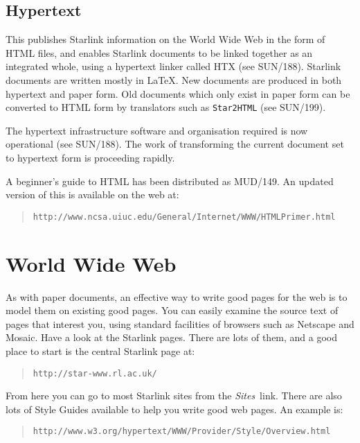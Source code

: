 \documentclass[twoside,11pt]{article}
\newcommand{\htmladdnormallink}[2]{#1}
\newcommand{\xref}[3]{#1}
\begin{document}
\subsection{Hypertext}

This publishes Starlink information on the World Wide Web in the
form of HTML files, and enables Starlink documents to be linked together
as an integrated whole, using a hypertext linker called HTX
(see \xref{SUN/188}{sun188}{}).
Starlink documents are written mostly in \LaTeX.
New documents are produced in both hypertext and paper form.
Old documents which only exist in paper form can be converted to HTML form by
translators such as {\tt Star2HTML}
(see \xref{SUN/199}{sun199}{}).

The hypertext infrastructure software and organisation required is now
operational
(see \xref{SUN/188}{sun188}{}).
The work of transforming the current document set to hypertext form is
proceeding rapidly.

A \htmladdnormallink{beginner's guide}{http://www.ncsa.uiuc.edu/General/Internet/WWW/HTMLPrimer.html}
to HTML has been distributed as MUD/149.
An updated version of this is available on the web at:
\begin{quote}
{\tt http://www.ncsa.uiuc.edu/General/Internet/WWW/HTMLPrimer.html}
\end{quote}

\section{World Wide Web}

As with paper documents, an effective way to write good pages for the web
is to model them on existing good pages.
You can easily examine the source text of pages that interest you, using
standard facilities of browsers such as Netscape and Mosaic.
Have a look at the Starlink pages.
There are lots of them, and a good place to start is the
\htmladdnormallink{central Starlink page}{http://star-www.rl.ac.uk/} at:
\begin{quote}
{\tt http://star-www.rl.ac.uk/}
\end{quote}
From here you can go to most Starlink sites from the {\em Sites}\, link.
There are also lots of Style Guides available to help you write good web pages.
An \htmladdnormallink{example}{http://www.w3.org/hypertext/WWW/Provider/Style/Overview.html} is:
\begin{quote}
{\tt http://www.w3.org/hypertext/WWW/Provider/Style/Overview.html}
\end{quote}
\end{document}
